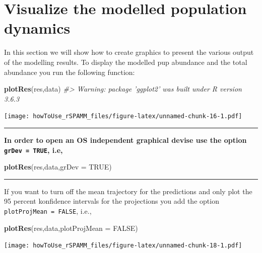 \documentclass[
]{article}
\newenvironment{Shaded}{\begin{snugshade}}{\end{snugshade}}
\newcommand{\CommentTok}[1]{\textcolor[rgb]{0.56,0.35,0.01}{\textit{#1}}}
\newcommand{\DataTypeTok}[1]{\textcolor[rgb]{0.13,0.29,0.53}{#1}}
\newcommand{\KeywordTok}[1]{\textcolor[rgb]{0.13,0.29,0.53}{\textbf{#1}}}
\newcommand{\NormalTok}[1]{#1}
\newcommand{\OtherTok}[1]{\textcolor[rgb]{0.56,0.35,0.01}{#1}}
\begin{document}
\hypertarget{visualize-the-modelled-population-dynamics}{%
\section{Visualize the modelled population
dynamics}\label{visualize-the-modelled-population-dynamics}}

In this section we will show how to create graphics to present the
various output of the modelling results. To display the modelled pup
abundance and the total abundance you run the following function:

\begin{Shaded}
\begin{Highlighting}[]
\KeywordTok{plotRes}\NormalTok{(res,data)}
\CommentTok{#> Warning: package 'ggplot2' was built under R version 3.6.3}
\end{Highlighting}
\end{Shaded}

\texttt{[image: howToUse\_rSPAMM\_files/figure-latex/unnamed-chunk-16-1.pdf]}

\begin{center}\rule{0.5\linewidth}{0.5pt}\end{center}

\textbf{In order to open an OS independent graphical devise use the
option \texttt{grDev\ =\ TRUE}, i.e,}

\begin{Shaded}
\begin{Highlighting}[]
\KeywordTok{plotRes}\NormalTok{(res,data,}\DataTypeTok{grDev =} \OtherTok{TRUE}\NormalTok{)}
\end{Highlighting}
\end{Shaded}

\begin{center}\rule{0.5\linewidth}{0.5pt}\end{center}

If you want to turn off the mean trajectory for the predictions and only
plot the 95 percent konfidence intervals for the projections you add the
option \texttt{plotProjMean\ =\ FALSE}, i.e.,

\begin{Shaded}
\begin{Highlighting}[]
\KeywordTok{plotRes}\NormalTok{(res,data,}\DataTypeTok{plotProjMean =} \OtherTok{FALSE}\NormalTok{)}
\end{Highlighting}
\end{Shaded}

\texttt{[image: howToUse\_rSPAMM\_files/figure-latex/unnamed-chunk-18-1.pdf]}
\end{document}
